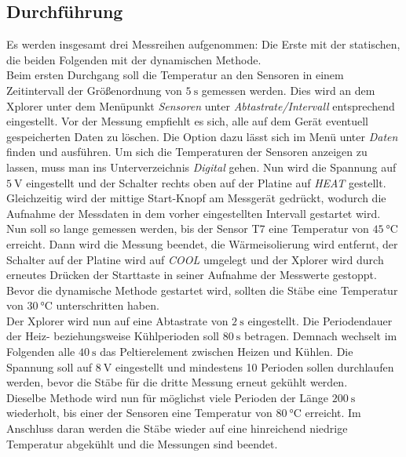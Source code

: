 \subsection{Durchführung}
Es werden insgesamt drei Messreihen aufgenommen: Die Erste mit der statischen, die beiden Folgenden 
mit der dynamischen Methode.\\
Beim ersten Durchgang soll die Temperatur an den Sensoren in einem Zeitintervall der Größenordnung von $\SI{5}{\second}$
gemessen werden. 
Dies wird an dem Xplorer unter dem Menüpunkt \textit{Sensoren} unter \textit{Abtastrate/Intervall} entsprechend eingestellt.
Vor der Messung empfiehlt es sich, alle auf dem Gerät eventuell gespeicherten Daten zu löschen. 
Die Option dazu lässt sich im Menü unter \textit{Daten} finden und ausführen. 
Um sich die Temperaturen der Sensoren anzeigen zu lassen, muss man ins Unterverzeichnis \textit{Digital} gehen.
Nun wird die Spannung auf $\SI{5}{\volt}$ eingestellt und der Schalter rechts oben auf der Platine 
auf \textit{HEAT} gestellt. 
Gleichzeitig wird der mittige Start-Knopf am Messgerät gedrückt, wodurch die Aufnahme der Messdaten in dem vorher
eingestellten Intervall gestartet wird. 
Nun soll so lange gemessen werden, bis der Sensor T7 eine Temperatur von $\SI{45}{\celsius}$ erreicht. 
Dann wird die Messung beendet, die Wärmeisolierung wird entfernt, der Schalter auf der Platine wird auf \textit{COOL} 
umgelegt und der Xplorer wird durch erneutes Drücken der Starttaste in seiner Aufnahme der Messwerte gestoppt. 
Bevor die dynamische Methode gestartet wird, sollten die Stäbe eine Temperatur von $\SI{30}{\celsius}$  
unterschritten haben. \\
Der Xplorer wird nun auf eine Abtastrate von $\SI{2}{\second}$ eingestellt. 
Die Periodendauer der Heiz- beziehungsweise Kühlperioden soll $\SI{80}{\second}$ betragen. 
Demnach wechselt im Folgenden alle $\SI{40}{\second}$ das Peltierelement zwischen Heizen und Kühlen.
Die Spannung soll auf $\SI{8}{\volt}$ eingestellt und mindestens 10 Perioden sollen durchlaufen werden, bevor die Stäbe 
für die dritte Messung erneut gekühlt werden. \\
Dieselbe Methode wird nun für möglichst viele Perioden der Länge $\SI{200}{\second}$ wiederholt, bis einer der Sensoren 
eine Temperatur von $\SI{80}{\celsius}$ erreicht. 
Im Anschluss daran werden die Stäbe wieder auf eine hinreichend niedrige Temperatur abgekühlt und die Messungen sind beendet.
